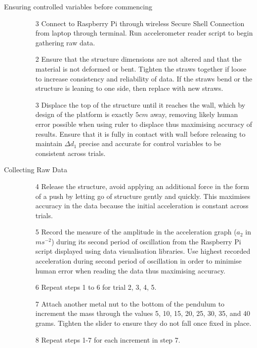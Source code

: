 \documentclass[11pt]{article}
\begin{document}
\begin{description}
    \item [Ensuring controlled variables before commencing] \phantom{.}
    \begin{itemize}
        \item [3] Connect to Raspberry Pi through wireless Secure Shell Connection from laptop through terminal. Run accelerometer reader script to begin gathering raw data. 
        \item [2] Ensure that the structure dimensions are not altered and that the material is not deformed or bent. Tighten the straws together if loose to increase consistency and reliability of data. If the straws bend or the structure is leaning to one side, then replace with new straws. 
        \item [3] Displace the top of the structure until it reaches the wall, which by design of the platform is exactly $5cm$ away, removing likely human error possible when using ruler to displace thus maximising accuracy of results. Ensure that it is fully in contact with wall before releasing to maintain $\Delta d_1$ precise and accurate for control variables to be consistent across trials. 
    \end{itemize}
    \item [Collecting Raw Data] \phantom{.}
    \begin{itemize}
        \item [4] Release the structure, avoid applying an additional force in the form of a push by letting go of structure gently and quickly. This maximises accuracy in the data because the initial acceleration is constant across trials. 
        \item [5] Record the measure of the amplitude in the acceleration graph ($a_2$ in $ms^{-2}$) during its second period of oscillation from the Raspberry Pi script displayed using data visualisation libraries. Use highest recorded acceleration during second period of oscillation in order to minimise human error when reading the data thus maximising accuracy.
        \item [6] Repeat steps 1 to 6 for trial 2, 3, 4, 5. 
        \item [7] Attach another metal nut to the bottom of the pendulum to increment the mass through the values 5, 10, 15, 20, 25, 30, 35, and 40 grams. Tighten the slider to ensure they do not fall once fixed in place.
        \item [8] Repeat steps 1-7 for each increment in step 7. 
    \end{itemize}
\end{description}
\end{document}
